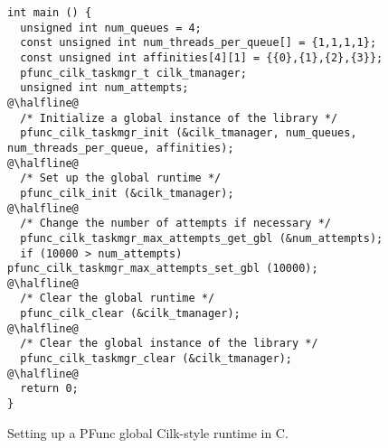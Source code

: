 \begin{figure}
\begin{center}
\begin{minipage}{0.85\textwidth}
\begin{lstlisting}[frame=lrtb]
int main () {
  unsigned int num_queues = 4;
  const unsigned int num_threads_per_queue[] = {1,1,1,1};
  const unsigned int affinities[4][1] = {{0},{1},{2},{3}};
  pfunc_cilk_taskmgr_t cilk_tmanager;
  unsigned int num_attempts;
@\halfline@
  /* Initialize a global instance of the library */
  pfunc_cilk_taskmgr_init (&cilk_tmanager, num_queues, num_threads_per_queue, affinities);
@\halfline@
  /* Set up the global runtime */
  pfunc_cilk_init (&cilk_tmanager);
@\halfline@
  /* Change the number of attempts if necessary */
  pfunc_cilk_taskmgr_max_attempts_get_gbl (&num_attempts);
  if (10000 > num_attempts) pfunc_cilk_taskmgr_max_attempts_set_gbl (10000);
@\halfline@
  /* Clear the global runtime */
  pfunc_cilk_clear (&cilk_tmanager);
@\halfline@
  /* Clear the global instance of the library */
  pfunc_cilk_taskmgr_clear (&cilk_tmanager);
@\halfline@
  return 0;
}
\end{lstlisting}
\end{minipage}
\end{center}
\caption{Setting up a PFunc global Cilk-style runtime in C.}
\label{fig:c_global}
\end{figure}
